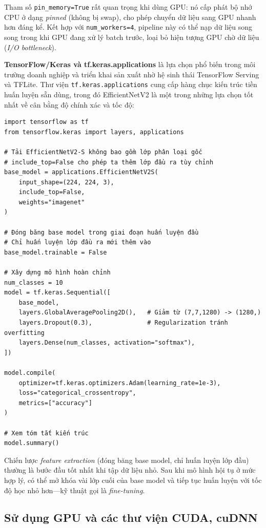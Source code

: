 Tham số \texttt{pin\_memory=True} rất quan trọng khi dùng GPU: nó cấp phát bộ nhớ CPU ở dạng \textit{pinned} (không bị swap), cho phép chuyển dữ liệu sang GPU nhanh hơn đáng kể. Kết hợp với \texttt{num\_workers=4}, pipeline này có thể nạp dữ liệu song song trong khi GPU đang xử lý batch trước, loại bỏ hiện tượng GPU chờ dữ liệu (\textit{I/O bottleneck}).

\vspace{0.5em}
\textbf{TensorFlow/Keras và tf.keras.applications} là lựa chọn phổ biến trong môi trường doanh nghiệp và triển khai sản xuất nhờ hệ sinh thái TensorFlow Serving và TFLite. Thư viện \texttt{tf.keras.applications} cung cấp hàng chục kiến trúc tiền huấn luyện sẵn dùng, trong đó EfficientNetV2 là một trong những lựa chọn tốt nhất về cân bằng độ chính xác và tốc độ:

\begin{verbatim}
import tensorflow as tf
from tensorflow.keras import layers, applications

# Tải EfficientNetV2-S không bao gồm lớp phân loại gốc
# include_top=False cho phép ta thêm lớp đầu ra tùy chỉnh
base_model = applications.EfficientNetV2S(
    input_shape=(224, 224, 3),
    include_top=False,
    weights="imagenet"
)

# Đóng băng base model trong giai đoạn huấn luyện đầu
# Chỉ huấn luyện lớp đầu ra mới thêm vào
base_model.trainable = False

# Xây dựng mô hình hoàn chỉnh
num_classes = 10
model = tf.keras.Sequential([
    base_model,
    layers.GlobalAveragePooling2D(),   # Giảm từ (7,7,1280) -> (1280,)
    layers.Dropout(0.3),               # Regularization tránh overfitting
    layers.Dense(num_classes, activation="softmax"),
])

model.compile(
    optimizer=tf.keras.optimizers.Adam(learning_rate=1e-3),
    loss="categorical_crossentropy",
    metrics=["accuracy"]
)

# Xem tóm tắt kiến trúc
model.summary()
\end{verbatim}

Chiến lược \textit{feature extraction} (đóng băng base model, chỉ huấn luyện lớp đầu) thường là bước đầu tốt nhất khi tập dữ liệu nhỏ. Sau khi mô hình hội tụ ở mức hợp lý, có thể mở khóa vài lớp cuối của base model và tiếp tục huấn luyện với tốc độ học nhỏ hơn---kỹ thuật gọi là \textit{fine-tuning}.

\subsection{Sử dụng GPU và các thư viện CUDA, cuDNN}
\label{subsec:gpu_setup}

